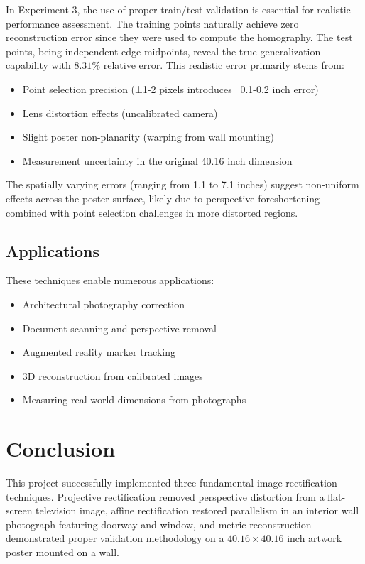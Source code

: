 In Experiment 3, the use of proper train/test validation is essential for realistic performance assessment. The training points naturally achieve zero reconstruction error since they were used to compute the homography. The test points, being independent edge midpoints, reveal the true generalization capability with $8.31\%$ relative error. This realistic error primarily stems from:
\begin{itemize}
    \item Point selection precision (±1-2 pixels introduces ~0.1-0.2 inch error)
    \item Lens distortion effects (uncalibrated camera)
    \item Slight poster non-planarity (warping from wall mounting)
    \item Measurement uncertainty in the original 40.16 inch dimension
\end{itemize}

The spatially varying errors (ranging from 1.1 to 7.1 inches) suggest non-uniform effects across the poster surface, likely due to perspective foreshortening combined with point selection challenges in more distorted regions.

\subsection{Applications}
These techniques enable numerous applications:
\begin{itemize}
    \item Architectural photography correction
    \item Document scanning and perspective removal
    \item Augmented reality marker tracking
    \item 3D reconstruction from calibrated images
    \item Measuring real-world dimensions from photographs
\end{itemize}

\section{Conclusion}

This project successfully implemented three fundamental image rectification techniques. Projective rectification removed perspective distortion from a flat-screen television image, affine rectification restored parallelism in an interior wall photograph featuring doorway and window, and metric reconstruction demonstrated proper validation methodology on a $40.16 \times 40.16$ inch artwork poster mounted on a wall.

